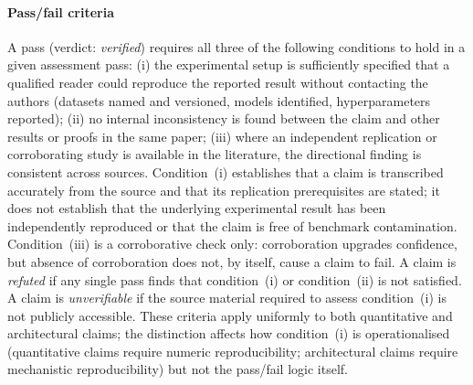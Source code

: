 \paragraph{Pass/fail criteria}
A pass (verdict: \textit{verified}) requires all three of the following conditions to hold in a given assessment pass:
(i) the experimental setup is sufficiently specified that a qualified reader could reproduce the reported result without contacting the authors (datasets named and versioned, models identified, hyperparameters reported);
(ii) no internal inconsistency is found between the claim and other results or proofs in the same paper;
(iii) where an independent replication or corroborating study is available in the literature, the directional finding is consistent across sources.
Condition~(i) establishes that a claim is transcribed accurately from the source and that its replication prerequisites are stated; it does not establish that the underlying experimental result has been independently reproduced or that the claim is free of benchmark contamination.
Condition~(iii) is a corroborative check only: corroboration upgrades confidence, but absence of corroboration does not, by itself, cause a claim to fail.
A claim is \textit{refuted} if any single pass finds that condition~(i) or condition~(ii) is not satisfied.
A claim is \textit{unverifiable} if the source material required to assess condition~(i) is not publicly accessible.
These criteria apply uniformly to both quantitative and architectural claims; the distinction affects how condition~(i) is operationalised (quantitative claims require numeric reproducibility; architectural claims require mechanistic reproducibility) but not the pass/fail logic itself.


